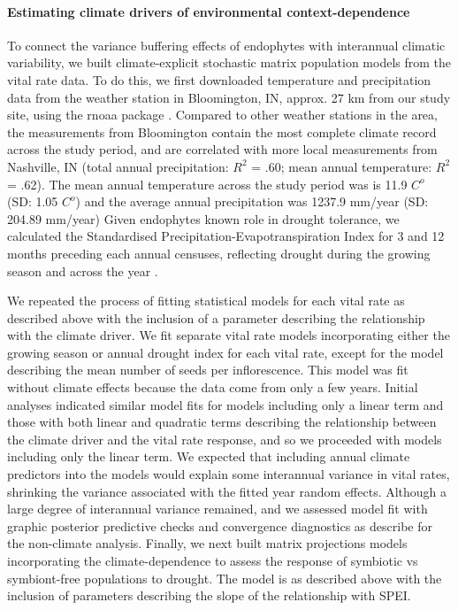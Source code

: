\documentclass[12pt]{article}
\begin{document}
\paragraph*{Estimating climate drivers of environmental context-dependence}
To connect the variance buffering effects of endophytes with interannual climatic variability, we built climate-explicit stochastic matrix population models from the vital rate data.
To do this, we first downloaded temperature and precipitation data from the weather station in Bloomington, IN,  approx. 27 km from our study site, using the rnoaa package \cite{chamberlain2022package}. 
Compared to other weather stations in the area, the measurements from Bloomington contain the most complete climate record across the study period, and are correlated with more local measurements from Nashville, IN (total annual precipitation: $R^2$ = .60; mean annual temperature: $R^2$ = .62).
The mean annual temperature across the study period was is 11.9 $C^o $ (SD: 1.05 $C^o $) and the average annual precipitation was 1237.9 mm/year (SD: 204.89 mm/year)
Given endophytes known role in drought tolerance, we calculated the Standardised Precipitation-Evapotranspiration Index for 3 and 12 months preceding each annual censuses, reflecting drought during the growing season and across the year \cite{vicente2010multiscalar}.

We repeated the process of fitting statistical models for each vital rate as described above with the inclusion of a parameter describing the relationship with the climate driver. 
We fit separate vital rate models incorporating either the growing season or annual drought index for each vital rate, except for the model describing the mean number of seeds per inflorescence. 
This model was fit without climate effects because the data come from only a few years.
Initial analyses indicated similar model fits for models including only a linear term and those with both linear and  quadratic terms describing the relationship between the climate driver and the vital rate response, and so we proceeded with models including only the linear term.
We expected that including annual climate predictors into the models would explain some interannual variance in vital rates, shrinking the variance associated with the fitted year random effects.
Although a large degree of interannual variance remained, and we assessed model fit with graphic posterior predictive checks and convergence diagnostics as describe for the non-climate analysis. 
Finally, we next built matrix projections models incorporating the climate-dependence to assess the response of symbiotic vs symbiont-free populations to drought. 
The model is as described above with the inclusion of parameters describing the slope of the relationship with SPEI. 
\end{document}
